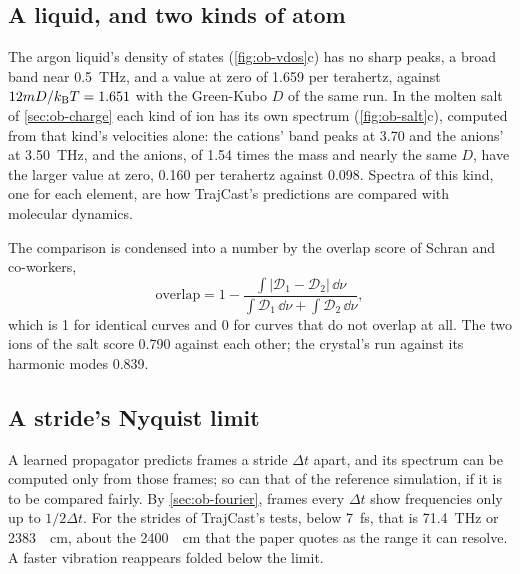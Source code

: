 \subsection*{A liquid, and two kinds of atom}

The argon liquid's density of states (\cref{fig:ob-vdos}c) has no sharp
peaks, a broad band near \SI{0.5}{\tera\hertz}, and a value at zero of
1.659 per terahertz, against $12mD/k_{\mathrm{B}} T = 1.651$ with the Green-Kubo $D$
of the same run. In the molten salt of \cref{sec:ob-charge} each kind of
ion has its own spectrum (\cref{fig:ob-salt}c), computed from that kind's
velocities alone: the cations' band peaks at 3.70 and the anions' at
\SI{3.50}{\tera\hertz}, and the anions, of 1.54 times the mass and nearly
the same $D$, have the larger value at zero, 0.160 per terahertz against
0.098. Spectra of this kind, one for each element, are how TrajCast's
predictions are compared with molecular dynamics\cite{Thiemann2026}.

The comparison is condensed into a number by the overlap score of
Schran and co-workers\cite{Schran2021},
\begin{equation*}
   \text{overlap} = 1 - \frac{\int\lvert\mathcal{D}_1 - \mathcal{D}_2\rvert
   \,\dd\nu}{\int\mathcal{D}_1\,\dd\nu + \int\mathcal{D}_2\,\dd\nu} ,
\end{equation*}
which is 1 for identical curves and 0 for curves that do not overlap at
all. The two ions of the salt score 0.790 against each other; the
crystal's run against its harmonic modes 0.839.

\subsection*{A stride's Nyquist limit}

A learned propagator predicts frames a stride $\Delta t$ apart, and its
spectrum can be computed only from those frames; so can that of the
reference simulation, if it is to be compared fairly. By
\cref{sec:ob-fourier}, frames every $\Delta t$ show frequencies only up
to $1/2\Delta t$. For the strides of TrajCast's tests, below
\SI{7}{\femto\second}, that is \SI{71.4}{\tera\hertz} or
\SI{2383}{\per\centi\metre}, about the \SI{2400}{\per\centi\metre} that the
paper quotes as the range it can resolve\cite{Thiemann2026}. A faster
vibration reappears folded below the limit.

